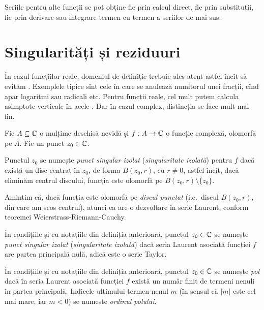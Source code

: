 Seriile pentru alte funcții se pot obține fie prin calcul direct, fie
prin substituții, fie prin derivare sau integrare termen cu termen a
seriilor de mai sus.

\section{Singularități și reziduuri}

În cazul funcțiilor reale, domeniul de definiție trebuie ales atent astfel încît
să evităm . Exemplele tipice sînt cele în care se
anulează numitorul unei fracții, cînd apar logaritmi sau radicali etc.
Pentru funcții reale, cel mult putem calcula asimptote verticale în acele
. Dar în cazul complex, distincția se face mult mai fin.

\begin{definition}\label{def:sing-iz}
  Fie $ A \subseteq \mathbb{C} $ o mulțime deschisă nevidă și $ f : A \to \mathbb{C} $ o funcție
  complexă, olomorfă pe $ A $. Fie un punct $ z_0 \in \mathbb{C} $.

  Punctul $ z_0 $ se numește \emph{punct singular izolat} (\emph{singularitate izolată})
  pentru $ f $ dacă există un disc centrat în $ z_0 $, de forma $ B(z_0, r) $, cu
  $ r \neq 0 $, astfel încît, dacă eliminăm centrul discului, funcția este
  olomorfă pe $ B(z_0, r) \setminus \{ z_0 \} $.
\end{definition}

Amintim că, dacă funcția este olomorfă pe \emph{discul punctat} (i.e.\ discul
$ B(z_0, r) $, din care am scos centrul), atunci ea are o dezvoltare în serie Laurent,
conform teoremei Weierstrass-Riemann-Cauchy.

\begin{definition}\label{def:sing-ap}
  În condițiile și cu notațiile din definiția anterioară, punctul $ z_0 \in \mathbb{C} $
  se numește \emph{punct singular izolat} (\emph{singularitate izolată}) dacă
  seria Laurent asociată funcției $ f $ are partea principală nulă, adică este
  o serie Taylor.
\end{definition}

\begin{definition}\label{def:pol}
  În condițiile și cu notațiile din definiția anterioară, punctul $ z_0 \in \mathbb{C} $
  se numește \emph{pol} dacă în seria Laurent asociată funcției $ f $ există
  un număr finit de termeni nenuli în partea principală. Indicele ultimului
  termen nenul $ m $ (în sensul că $ |m| $ este cel mai mare, iar $ m < 0 $)
  se numește \emph{ordinul polului}.
\end{definition}

